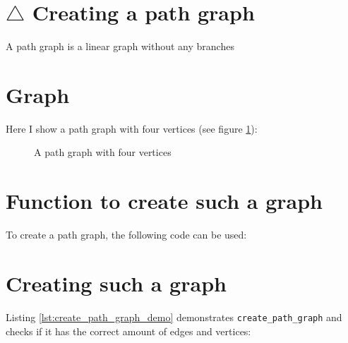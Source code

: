 \section{$\triangle$ Creating a path graph}
\label{subsec:create_path_graph}

A path graph is a linear graph without any branches

\section{Graph}

Here I show a path graph with four vertices 
(see figure \ref{fig:create_path_graph}):

\begin{figure}
  \caption{A path graph with four vertices}
  \label{fig:create_path_graph}
\end{figure}

\section{Function to create such a graph}

To create a path graph, the following code can be used:



\section{Creating such a graph}

Listing \ref{lst:create_path_graph_demo}
demonstrates \verb;create_path_graph; 
and checks if it has the correct amount of edges and vertices:



